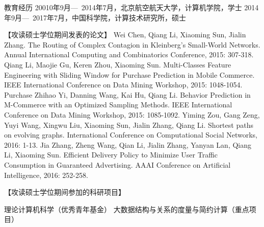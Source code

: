 
\begin{resume}

\begin{resumelist*}{教育经历}
\resumelistitem 20010年9月---~2014年7月，北京航空航天大学，计算机学院，学士
\resumelistitem 2014年9月---~2017年7月，中国科学院，计算技术研究所，硕士
\end{resumelist*}

\begin{resumelist}{【攻读硕士学位期间发表的论文】}
\resumelistitem Wei Chen, Qiang Li, Xiaoming Sun, Jialin Zhang. The Routing of Complex Contagion in Kleinberg's Small-World Networks. Annual International Computing and Combinatorics Conference, 2015: 307-318.
\resumelistitem Qiang Li, Maojie Gu, Keren Zhou, Xiaoming Sun. Multi-Classes Feature Engineering with Sliding Window for Purchase Prediction in Mobile Commerce. IEEE International Conference on Data Mining Workshop, 2015: 1048-1054.
\resumelistitem Purchase Zhihao Yi, Danning Wang, Kai Hu, Qiang Li. Behavior Prediction in M-Commerce with an Optimized Sampling Methods. IEEE International Conference on Data Mining Workshop, 2015: 1085-1092.
\resumelistitem Yiming Zou, Gang Zeng, Yuyi Wang, Xingwu Liu, Xiaoming Sun, Jialin Zhang, Qiang Li. Shortest paths on evolving graphs. International Conference on Computational Social Networks, 2016: 1-13.
\resumelistitem Jia Zhang, Zheng Wang, Qian Li, Jialin Zhang, Yanyan Lan, Qiang Li, Xiaoming Sun. Efficient Delivery Policy to Minimize User Traffic Consumption in Guaranteed Advertising. AAAI Conference on Artificial Intelligence, 2016: 252-258.
\end{resumelist}

\begin{resumelist}{【攻读硕士学位期间参加的科研项目】}

\resumelistitem 理论计算机科学（优秀青年基金）
\resumelistitem 大数据结构与关系的度量与简约计算（重点项目）

\end{resumelist}

\end{resume}
